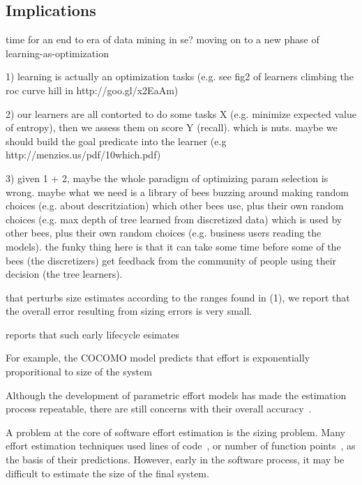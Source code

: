 
\subsection{Implications}

time for an end to era of data mining in se? moving on to a new phase of learning-as-optimization

1) learning is actually an optimization tasks (e.g. see fig2 of  learners climbing the roc curve hill in http://goo.gl/x2EaAm)

2) our learners are all contorted to do some tasks X (e.g. minimize expected value of entropy), then we assess them on score Y (recall). which is nuts. maybe we should build the goal predicate into the learner (e.g http://menzies.us/pdf/10which.pdf) 

3) given 1 + 2, maybe the whole paradigm of optimizing param selection is wrong. maybe what we need is a library of bees buzzing around making random choices (e.g. about descritziation) which other bees use, plus their own random choices (e.g. max depth of tree learned from discretized data) which is used by other bees, plus their own random choices (e.g. business users reading the models).  the funky thing here is that it can take some time before some of the bees (the discretizers) get feedback from the community of people using their decision (the tree learners). 





  
  that perturbs size estimates
  according to the ranges found in (1), we report that the overall error resulting
  from sizing errors is very small.
 

reports that such early lifecycle
esimates

For example, the COCOMO model predicts
that effort is exponentially proporitional to size of the system


Although the development
of parametric effort models has made the estimation
process repeatable, there are still concerns with
their overall
accuracy~\cite{Menzies2005,Molkken2003,Ferens1998,Kemerer1987}.




A problem at the core of software effort estimation
is the sizing problem.
Many effort estimation techniques used lines of code~\cite{boehm81}, or number of
function points~\cite{Hihn1991},
as the basis of their predictions.
However, early in the software process, it may be  difficult to estimate the size of the final system.

